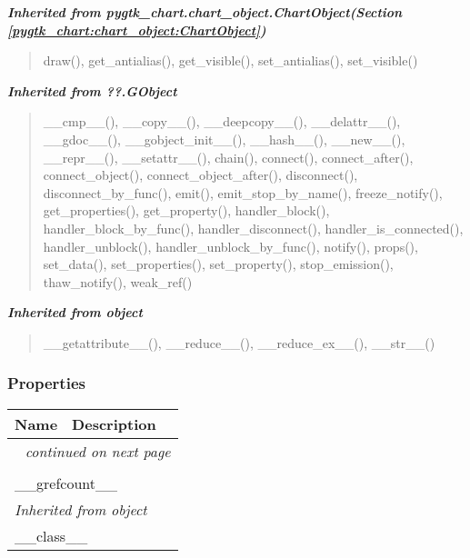 \large{\textbf{\textit{Inherited from pygtk\_chart.chart\_object.ChartObject\textit{(Section \ref{pygtk_chart:chart_object:ChartObject})}}}}

\begin{quote}
draw(), get\_antialias(), get\_visible(), set\_antialias(), set\_visible()
\end{quote}

\large{\textbf{\textit{Inherited from ??.GObject}}}

\begin{quote}
\_\_cmp\_\_(), \_\_copy\_\_(), \_\_deepcopy\_\_(), \_\_delattr\_\_(), \_\_gdoc\_\_(), \_\_gobject\_init\_\_(), \_\_hash\_\_(), \_\_new\_\_(), \_\_repr\_\_(), \_\_setattr\_\_(), chain(), connect(), connect\_after(), connect\_object(), connect\_object\_after(), disconnect(), disconnect\_by\_func(), emit(), emit\_stop\_by\_name(), freeze\_notify(), get\_properties(), get\_property(), handler\_block(), handler\_block\_by\_func(), handler\_disconnect(), handler\_is\_connected(), handler\_unblock(), handler\_unblock\_by\_func(), notify(), props(), set\_data(), set\_properties(), set\_property(), stop\_emission(), thaw\_notify(), weak\_ref()
\end{quote}

\large{\textbf{\textit{Inherited from object}}}

\begin{quote}
\_\_getattribute\_\_(), \_\_reduce\_\_(), \_\_reduce\_ex\_\_(), \_\_str\_\_()
\end{quote}


  \subsubsection{Properties}

    \vspace{-1cm}
\hspace{\varindent}\begin{longtable}{|p{\varnamewidth}|p{\vardescrwidth}|l}
\cline{1-2}
\cline{1-2} \centering \textbf{Name} & \centering \textbf{Description}& \\
\cline{1-2}
\endhead\cline{1-2}\multicolumn{3}{r}{\small\textit{continued on next page}}\\\endfoot\cline{1-2}
\endlastfoot\multicolumn{2}{|l|}{\textit{Inherited from ??.GObject}}\\
\multicolumn{2}{|p{\varwidth}|}{\raggedright \_\_grefcount\_\_}\\
\cline{1-2}
\multicolumn{2}{|l|}{\textit{Inherited from object}}\\
\multicolumn{2}{|p{\varwidth}|}{\raggedright \_\_class\_\_}\\
\cline{1-2}
\end{longtable}


